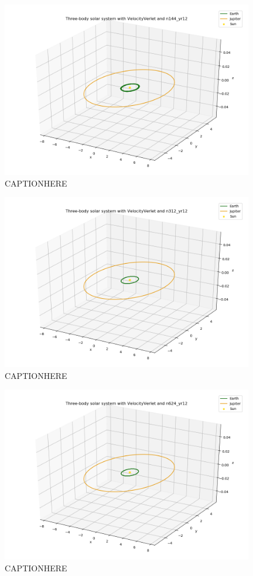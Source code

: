 \documentclass{article}
\begin{document}
    \begin{figure}[H]
        \centering
        \includegraphics[width = 11cm]{img/plot3D_S_E_J_V_n144_yr12.png}
        \caption{CAPTIONHERE}
        \label{fig:plot3D_S_E_J_V_n144_yr12}
    \end{figure}

    \begin{figure}[H]
        \centering
        \includegraphics[width = 11cm]{img/plot3D_S_E_J_V_n312_yr12.png}
        \caption{CAPTIONHERE}
        \label{fig:plot3D_S_E_J_V_n312_yr12}
    \end{figure}

    \begin{figure}[H]
        \centering
        \includegraphics[width = 11cm]{img/plot3D_S_E_J_V_n624_yr12.png}
        \caption{CAPTIONHERE}
        \label{fig:plot3D_S_E_J_V_624_yr12}
    \end{figure}
\end{document}
